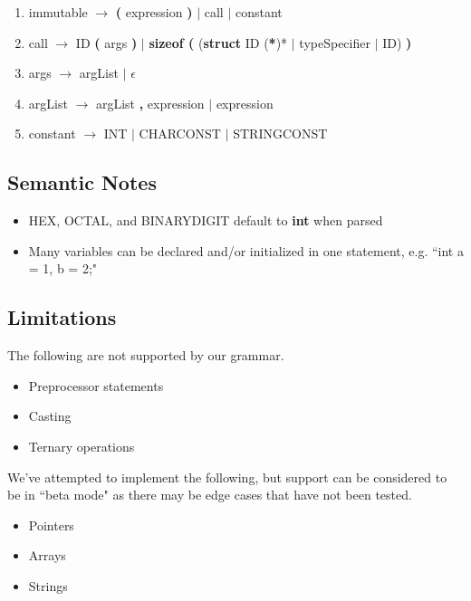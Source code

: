 \documentclass{article}
\begin{document}
\begin{enumerate}
\item immutable $\rightarrow$ 
    \textbf{(} expression \textbf{)} 
    $|$ call 
    $|$ constant

\item call $\rightarrow$ 
    ID \textbf{(} args \textbf{)}
    $|$ \textbf{sizeof (} (\textbf{struct} ID (\textbf{*})* $|$ typeSpecifier $|$ ID) \textbf{)}

\item args $\rightarrow$ 
    argList $|$ $\epsilon$

\item argList $\rightarrow$ 
    argList \textbf{,} expression $|$ expression

\item constant $\rightarrow$ 
    INT $|$ CHARCONST $|$ STRINGCONST
\end{enumerate}

\subsection{Semantic Notes}
\begin{itemize}
    \item HEX, OCTAL, and BINARYDIGIT default to \textbf{int} when parsed
    \item Many variables can be declared and/or initialized in one statement, e.g. ``int a = 1, b = 2;"
\end{itemize}

\subsection{Limitations}
The following are not supported by our grammar.
\begin{itemize}
    \item Preprocessor statements
    \item Casting
    \item Ternary operations
\end{itemize}
We've attempted to implement the following, but support can be considered to be in ``beta mode" as there may be edge cases that have not been tested.
\begin{itemize}
    \item Pointers
    \item Arrays
    \item Strings
\end{itemize}
\end{document}
